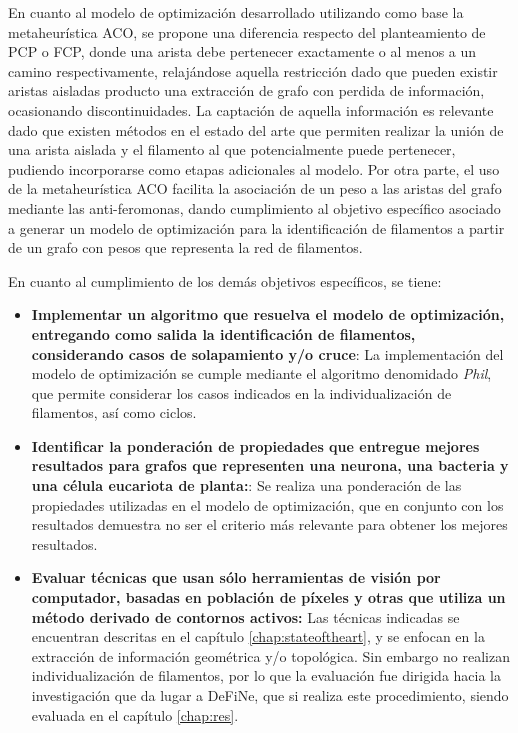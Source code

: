 En cuanto al modelo de optimizaci\'on desarrollado utilizando como base la metaheur\'istica ACO, se propone una diferencia respecto del planteamiento de PCP o FCP, donde una arista debe pertenecer exactamente o al menos a un camino respectivamente, relaj\'andose aquella restricci\'on dado que pueden existir aristas aisladas producto una extracci\'on de grafo con perdida de informaci\'on, ocasionando discontinuidades. La captaci\'on de aquella informaci\'on es relevante dado que existen m\'etodos en el estado del arte que permiten realizar la uni\'on de una arista aislada y el filamento al que potencialmente puede pertenecer, pudiendo incorporarse como etapas adicionales al modelo.
Por otra parte, el uso de la metaheur\'istica ACO facilita la asociaci\'on de un peso a las aristas del grafo mediante las anti-feromonas, dando cumplimiento al objetivo espec\'ifico asociado a generar un modelo de optimizaci\'on para la identificaci\'on de filamentos a partir de un grafo con pesos que representa la red de filamentos.

En cuanto al cumplimiento de los dem\'as objetivos espec\'ificos, se tiene:
\begin{itemize}
    \item {\bf Implementar un algoritmo que resuelva el modelo de optimizaci\'on, entregando como salida la identificaci\'on de filamentos, considerando casos de solapamiento y/o cruce}: La implementaci\'on del modelo de optimizaci\'on se cumple mediante el algoritmo denomidado {\it Phil}, que permite considerar los casos indicados en la individualizaci\'on de filamentos, as\'i como ciclos.
    
    \item {\bf Identificar la ponderaci\'on de propiedades que entregue mejores resultados para grafos que representen una neurona, una bacteria y una c\'elula eucariota de planta:}: Se realiza una ponderaci\'on de las propiedades utilizadas en el modelo de 
    optimizaci\'on, que en conjunto con los resultados demuestra no ser el criterio m\'as relevante para obtener los mejores resultados.
    
    \item {\bf Evaluar t\'ecnicas que usan s\'olo herramientas de visi\'on por computador, basadas en poblaci\'on de p\'ixeles y otras que utiliza un m\'etodo derivado de contornos activos:} Las t\'ecnicas indicadas se encuentran descritas en el cap\'itulo \ref{chap:stateoftheart}, y se enfocan en la extracci\'on de informaci\'on geom\'etrica y/o topol\'ogica. Sin embargo no realizan individualizaci\'on de filamentos, por lo que la evaluaci\'on fue dirigida hacia la investigaci\'on que da lugar a DeFiNe, que si realiza este procedimiento, siendo evaluada en el cap\'itulo \ref{chap:res}.
\end{itemize}


